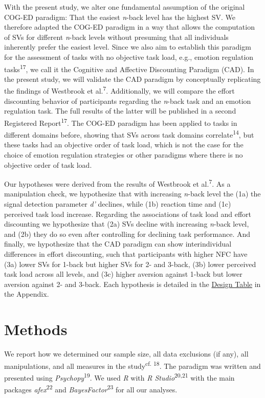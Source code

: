 \documentclass[
  man,floatsintext]{apa6}
\begin{document}
With the present study, we alter one fundamental assumption of the original COG-ED paradigm: That the easiest \emph{n}-back level has the highest SV.
We therefore adapted the COG-ED paradigm in a way that allows the computation of SVs for different \emph{n}-back levels without presuming that all individuals inherently prefer the easiest level.
Since we also aim to establish this paradigm for the assessment of tasks with no objective task load, e.g., emotion regulation tasks\textsuperscript{17}, we call it the Cognitive and Affective Discounting Paradigm (CAD).
In the present study, we will validate the CAD paradigm by conceptually replicating the findings of Westbrook et al.\textsuperscript{7}.
Additionally, we will compare the effort discounting behavior of participants regarding the \emph{n}-back task and an emotion regulation task.
The full results of the latter will be published in a second Registered Report\textsuperscript{17}.
The COG-ED paradigm has been applied to tasks in different domains before, showing that SVs across task domains correlate\textsuperscript{14}, but these tasks had an objective order of task load, which is not the case for the choice of emotion regulation strategies or other paradigms where there is no objective order of task load.

Our hypotheses were derived from the results of Westbrook et al.\textsuperscript{7}.
As a manipulation check, we hypothesize that with increasing \emph{n}-back level the (1a) the signal detection parameter \emph{d'} declines, while (1b) reaction time and (1c) perceived task load increase.
Regarding the associations of task load and effort discounting we hypothesize that (2a) SVs decline with increasing \emph{n}-back level, and (2b) they do so even after controlling for declining task performance.
And finally, we hypothesize that the CAD paradigm can show interindividual differences in effort discounting, such that participants with higher NFC have (3a) lower SVs for 1-back but higher SVs for 2- and 3-back, (3b) lower perceived task load across all levels, and (3c) higher aversion against 1-back but lower aversion against 2- and 3-back.
Each hypothesis is detailed in the \protect\hyperlink{DesignTableSection}{Design Table} in the Appendix.

\hypertarget{methods}{%
\section{Methods}\label{methods}}

We report how we determined our sample size, all data exclusions (if any), all manipulations, and all measures in the study\textsuperscript{cf. 18}.
The paradigm was written and presented using \emph{Psychopy}\textsuperscript{19}.
We used \emph{R} with \emph{R Studio}\textsuperscript{20,21} with the main packages \emph{afex}\textsuperscript{22} and \emph{BayesFactor}\textsuperscript{23} for all our analyses.
\end{document}
